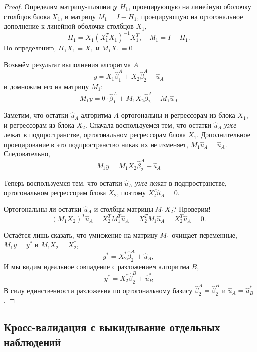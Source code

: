 \documentclass[12pt]{article}
\newcommand{\hb}{\hat{\beta}}
\newcommand{\hu}{\hat{u}}
\newcommand{\RSS}{RSS}
\begin{document}
\begin{proof}
Определим матрицу-шляпницу $H_1$, проецирующую на линейную оболочку столбцов блока $X_1$, и матрицу $M_1 = I - H_1$, проецирующую на ортогональное дополнение к линейной оболочке столбцов $X_1$,
\[
H_1 = X_1(X_1^TX_1)^{-1}X_1^T, \quad M_1 = I - H_1.
\]
По определению, $H_1 X_1 = X_1$ и $M_1 X_1 = 0$.

Возьмём результат выполнения алгоритма $A$
\[
y = X_1 \hb_1^A + X_2 \hb_2^A + \hu_A
\]
и домножим его на матрицу $M_1$:
\[
M_1 y = 0 \cdot \hb_1^A + M_1 X_2 \hb_2^A + M_1 \hu_A
\]

Заметим, что остатки $\hu_A$ алгоритма $A$ ортогональны и регрессорам из блока $X_1$, и регрессорам из блока $X_2$. 
Сначала воспользуемся тем, что остатки $\hu_A$ \emph{уже} лежат в подпространстве, ортогональном регрессорам блока $X_1$. 
Дополнительное проецирование в это подпространство никак их не изменяет, $M_1 \hu_A  = \hu_A$.
Следовательно,
\[
M_1 y  = M_1 X_2 \hb_2^A + \hu_A
\]

Теперь воспользуемся тем, что остатки $\hu_A$ \emph{уже} лежат в подпространстве, ортогональном регрессорам блока $X_2$, поэтому $X_2^T \hu_A = 0$.

Ортогональны ли остатки $\hu_A$ и столбцы матрицы $M_1 X_2$? Проверим!
\[
(M_1 X_2)^T \hu_A = X_2^T M_1^T \hu_A = X_2^T M_1 \hu_A = X_2^T \hu_A = 0.
\]

Остаётся лишь сказать, что умножение на матрицу $M_1$ очищает переменные, $M_1 y = y^*$ и $M_1 X_2 = X_2^*$,
\[
y^* = X_2^* \hb_2^A + \hu_A,
\]
И мы видим идеальное совпадение с разложением алгоритма $B$,
\[
y^* = X_2^* \hb_2^B + \hu^*_B
\]
В силу единственности разложения по ортогональному базису $\hb_2^A = \hb_2^B$ и $\hu_A = \hu^*_B$.
\end{proof}





\subsection{Кросс-валидация с выкидывание отдельных наблюдений}
\end{document}
